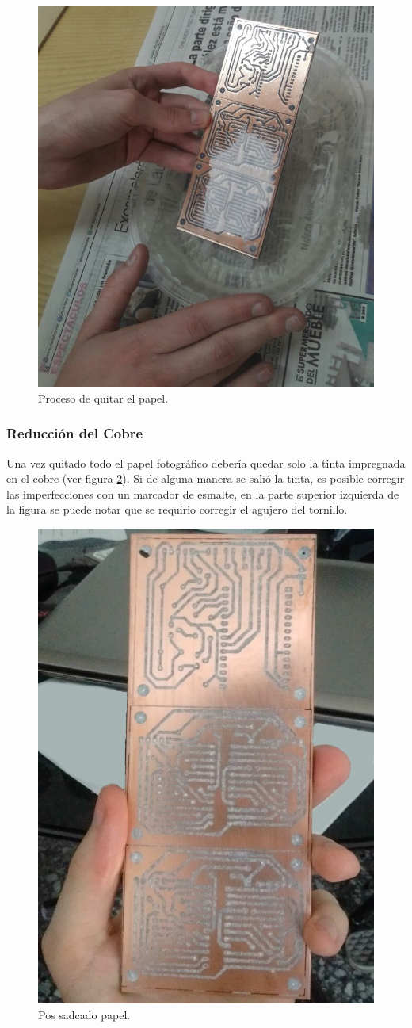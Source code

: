 \begin{figure}[ht!]
	\centering
	\includegraphics[width=0.6\linewidth]{imagenes/pcbeando/sacado-papel-1.png}
	\caption{Proceso de quitar el papel.}
	\label{fig:sacado-papel}
\end{figure}

\subsubsection{Reducción del Cobre}
Una vez quitado todo el papel fotográfico debería quedar solo la tinta impregnada en el cobre (ver figura \ref{fig:pos-sacado-papel-1}). Si de alguna manera se salió la tinta, es posible corregir las imperfecciones con un marcador de esmalte, en la parte superior izquierda de la figura se puede notar que se requirio corregir el agujero del tornillo.

\begin{figure}[ht!]
	\centering
	\includegraphics[width=0.47\linewidth]{imagenes/pcbeando/pos-sacado-pape-1.png}
	\caption{Pos sadcado papel.}
	\label{fig:pos-sacado-papel-1}
\end{figure}

